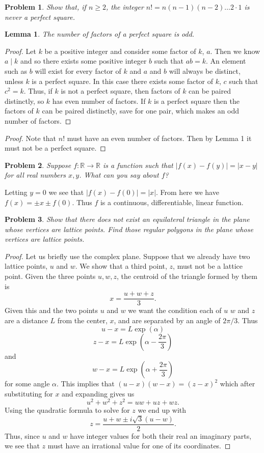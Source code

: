 \documentclass{article}
\newtheorem{problem}{Problem}
\newtheorem{lemma}{Lemma}
\begin{document}
\begin{flushleft}
\begin{problem}
Show that, if $n \geq 2$, the integer $n! = n (n-1) (n-2) \dots 2 \cdot 1$ is never a perfect square.
\end{problem}
\begin{lemma}
The number of factors of a perfect square is odd.
\end{lemma}
\begin{proof}
Let $k$ be a positive integer and consider some factor of $k$, $a$. Then we know $a \mid k$ and so there exists some positive integer $b$ such that $ab = k$. An element such as $b$ will exist for every factor of $k$ and $a$ and $b$ will always be distinct, unless $k$ is a perfect square. In this case there exists some factor of $k$, $c$ such that $c^2 = k$. Thus, if $k$ is not a perfect square, then factors of $k$ can be paired distinctly, so $k$ has even number of factors. If $k$ is a perfect square then the factors of $k$ can be paired distinctly, save for one pair, which makes an odd number of factors.
\end{proof}

\begin{proof}
Note that $n!$ must have an even number of factors. Then by Lemma 1 it must not be a perfect square.
\end{proof}

\begin{problem}
Suppose $f : \mathbb{R} \rightarrow \mathbb{R}$ is a function such that $|f(x) - f(y)| = |x - y|$ for all real numbers $x,y$. What can you say about $f$?
\end{problem}
Letting $y=0$ we see that $|f(x) - f(0)| = |x|$. From here we have $f(x) = \pm x \pm f(0)$. Thus $f$ is a continuous, differentiable, linear function.

\begin{problem}
Show that there does not exist an equilateral triangle in the plane whose vertices are lattice points. Find those regular polygons in the plane whose vertices are lattice points.
\end{problem}
\begin{proof}
Let us briefly use the complex plane. Suppose that we already have two lattice points, $u$ and $w$. We show that a third point, $z$, must not be a lattice point. Given the three points $u,w,z$, the centroid of the triangle formed by them is
\[
x = \frac{u+w+z}{3}.
\]
Given this and the two points $u$ and $w$ we want the condition each of $u$ $w$ and $z$ are a distance $L$ from the center, $x$, and are separated by an angle of $2 \pi /3$. Thus
\[
u-x = L \exp \left ( \alpha \right )
\]
\[
z-x = L \exp \left  ( \alpha - \frac{2 \pi}{3} \right )
\]
and
\[
w-x = L \exp \left ( \alpha + \frac{2 \pi}{3} \right )
\]
for some angle $\alpha$. This implies that $(u-x)(w-x) = (z-x)^2$ which after substituting for $x$ and expanding gives us
\[
u^2 + w^2 + z^2 = uw + uz + wz.
\]
Using the quadratic formula to solve for $z$ we end up with
\[
z = \frac{u + w \pm i \sqrt{3}(u-w)}{2}.
\]
Thus, since $u$ and $w$ have integer values for both their real an imaginary parts, we see that $z$ must have an irrational value for one of its coordinates.
\end{proof}


\end{flushleft}
\end{document}
